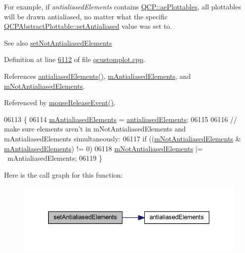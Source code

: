 For example, if {\itshape antialiased\+Elements} contains \hyperlink{a00143_ae55dbe315d41fe80f29ba88100843a0ca4145e4251b0cf2dbedabeea0a38f84f6}{Q\+C\+P\+::ae\+Plottables}, all plottables will be drawn antialiased, no matter what the specific \hyperlink{a00044_a4fd43e89be4a553ead41652565ff0581}{Q\+C\+P\+Abstract\+Plottable\+::set\+Antialiased} value was set to.

\begin{DoxySeeAlso}{See also}
\hyperlink{a00116_ae10d685b5eabea2999fb8775ca173c24}{set\+Not\+Antialiased\+Elements} 
\end{DoxySeeAlso}


Definition at line \hyperlink{a00115_source_l06112}{6112} of file \hyperlink{a00115_source}{qcustomplot.\+cpp}.



References \hyperlink{a00116_source_l01969}{antialiased\+Elements()}, \hyperlink{a00116_source_l02123}{m\+Antialiased\+Elements}, and \hyperlink{a00116_source_l02123}{m\+Not\+Antialiased\+Elements}.



Referenced by \hyperlink{a00115_source_l07691}{mouse\+Release\+Event()}.


\begin{DoxyCode}
06113 \{
06114   \hyperlink{a00116_a18feaee1080c45b74782bdbf0c252f89}{mAntialiasedElements} = \hyperlink{a00116_acc24388098ddb95f5a651cede3f34b99}{antialiasedElements};
06115   
06116   \textcolor{comment}{// make sure elements aren't in mNotAntialiasedElements and mAntialiasedElements simultaneously:}
06117   \textcolor{keywordflow}{if} ((\hyperlink{a00116_ac566e9d774e49dc4190346e02f31dcdf}{mNotAntialiasedElements} & \hyperlink{a00116_a18feaee1080c45b74782bdbf0c252f89}{mAntialiasedElements}) != 0)
06118     \hyperlink{a00116_ac566e9d774e49dc4190346e02f31dcdf}{mNotAntialiasedElements} |= ~mAntialiasedElements;
06119 \}
\end{DoxyCode}


Here is the call graph for this function\+:
\nopagebreak
\begin{figure}[H]
\begin{center}
\leavevmode
\includegraphics[width=339pt]{d4/d3e/a00116_af6f91e5eab1be85f67c556e98c3745e8_cgraph}
\end{center}
\end{figure}




